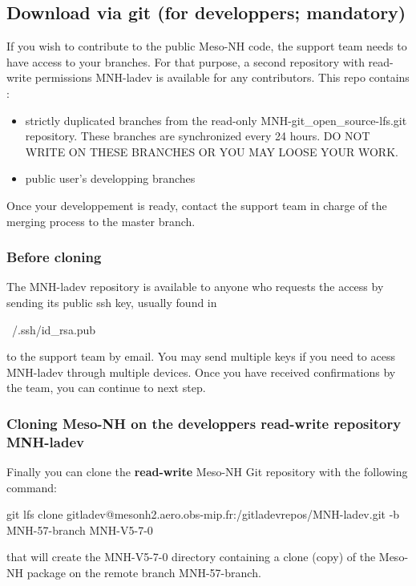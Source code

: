 \subsection{Download via git (for developpers; mandatory)}
\label{sec:dev_sec}
If you wish to contribute to the public Meso-NH code, the support team needs to have access to your branches. For that purpose, a second repository with read-write permissions MNH-ladev is available for any contributors. This repo contains :
\begin{itemize}
    \item strictly duplicated branches from the read-only MNH-git\_open\_source-lfs.git repository. These branches are synchronized every 24 hours. DO NOT WRITE ON THESE BRANCHES OR YOU MAY LOOSE YOUR WORK.
    \item public user's developping branches
\end{itemize}

Once your developpement is ready, contact the support team in charge of the merging process to the master branch.
\subsubsection{Before cloning}
The MNH-ladev repository is available to anyone who requests the access by sending its public ssh key, usually found in 
\begin{bashcode}
    ~/.ssh/id_rsa.pub
\end{bashcode}
to the support team by email. You may send multiple keys if you need to acess MNH-ladev through multiple devices.
Once you have received confirmations by the team, you can continue to next step.

\subsubsection{Cloning Meso-NH on the developpers read-write repository MNH-ladev}
Finally you can clone the \textbf{read-write} Meso-NH Git repository with the following command:
\begin{bashcode}
git lfs clone gitladev@mesonh2.aero.obs-mip.fr:/gitladevrepos/MNH-ladev.git -b MNH-57-branch MNH-V5-7-0
\end{bashcode}

that will create the MNH-V5-7-0 directory containing a clone (copy) of the Meso-NH package on the remote branch MNH-57-branch.

